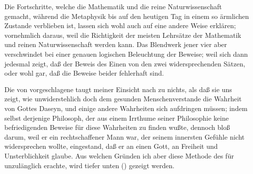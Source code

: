 \begin{aufza}
\item Die Fortschritte, welche die Mathematik und die reine Naturwissenschaft gemacht, während die Metaphysik bis auf den heutigen Tag in einem so ärmlichen Zustande verblieben ist, lassen sich wohl auch auf eine andere Weise erklären; vornehmlich daraus, weil die Richtigkeit der meisten Lehrsätze der Mathematik und reinen Naturwissenschaft  werden kann. Das Blendwerk jener vier  aber verschwindet bei einer genauen logischen Beleuchtung der Beweise; weil sich dann jedesmal zeigt, daß der Beweis des Einen von den zwei widersprechenden Sätzen, oder wohl gar, daß die Beweise beider fehlerhaft sind.
\item Die von  vorgeschlagene  taugt meiner Einsicht nach zu nichts, als daß sie uns zeigt, wie unwiderstehlich doch dem gesunden Menschenverstande die Wahrheit von Gottes Daseyn, und einige andere Wahrheiten sich aufdringen müssen; indem selbst derjenige Philosoph, der aus einem Irrthume seiner Philosophie keine befriedigenden Beweise für diese Wahrheiten zu finden wußte, dennoch bloß darum, weil er ein rechtschaffener Mann war, der seinem innersten Gefühle nicht widersprechen wollte, eingestand, daß er an einen Gott, an Freiheit und Unsterblichkeit glaube. Aus welchen Gründen ich aber diese Methode des  für unzulänglich erachte, wird tiefer unten () gezeigt werden.
\begin{RWanm}

\end{RWanm}
\end{aufza}
